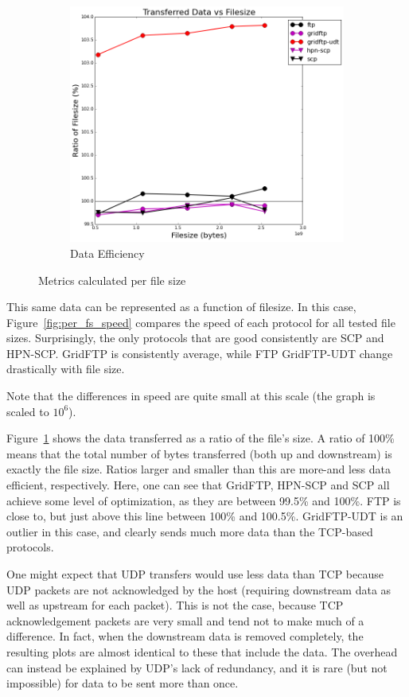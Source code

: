 \documentclass{sig-alternate-05-2015}
\begin{document}
\begin{figure}
\begin{subfigure}{.45\textwidth}
	\includegraphics[width=\textwidth]{img/per_filesize/data.png}
	\caption{Data Efficiency}
	\label{fig:per_fs_data}
	\end{subfigure}
\caption{Metrics calculated per file size}
\label{fig:per_fs}
\end{figure}
This same data can be represented as a function of filesize. In this case, Figure~\ref{fig:per_fs_speed} compares the speed of each protocol for all tested file sizes. Surprisingly, the only protocols that are good consistently are SCP and HPN-SCP. GridFTP is consistently average, while FTP GridFTP-UDT change drastically with file size. 

Note that the differences in speed are quite small at this scale (the graph is scaled to $10^6$).

Figure~\ref{fig:per_fs_data} shows the data transferred as a ratio of the file's size. A ratio of 100\% means that the total number of bytes transferred (both up and downstream) is exactly the file size. Ratios larger and smaller than this are more-and less data efficient, respectively.
Here, one can see that GridFTP, HPN-SCP and SCP all achieve some level of optimization, as they are between 99.5\% and 100\%. FTP is close to, but just above this line between 100\% and 100.5\%. GridFTP-UDT is an outlier in this case, and clearly sends much more data than the TCP-based protocols.

One might expect that UDP transfers would use less data than TCP because UDP packets are not acknowledged by the host (requiring downstream data as well as upstream for each packet). This is not the case, because TCP acknowledgement packets are very small and tend not to make much of a difference. In fact, when the downstream data is removed completely, the resulting plots are almost identical to these that include the data. The overhead can instead be explained by UDP's lack of redundancy, and it is rare (but not impossible) for data to be sent more than once.
\end{document}
